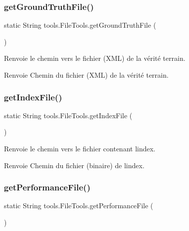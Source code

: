 \subsubsection{\texorpdfstring{get\+Ground\+Truth\+File()}{getGroundTruthFile()}}
{\footnotesize\ttfamily static String tools.\+File\+Tools.\+get\+Ground\+Truth\+File (\begin{DoxyParamCaption}{ }\end{DoxyParamCaption})\hspace{0.3cm}{\ttfamily [static]}}

Renvoie le chemin vers le fichier (X\+ML) de la vérité terrain.

\begin{DoxyReturn}{Renvoie}
Chemin du fichier (X\+ML) de la vérité terrain. 
\end{DoxyReturn}
\mbox{\label{classtools_1_1FileTools_a20238076992e33ac38b17cb439def559}} 
\subsubsection{\texorpdfstring{get\+Index\+File()}{getIndexFile()}}
{\footnotesize\ttfamily static String tools.\+File\+Tools.\+get\+Index\+File (\begin{DoxyParamCaption}{ }\end{DoxyParamCaption})\hspace{0.3cm}{\ttfamily [static]}}

Renvoie le chemin vers le fichier contenant l\textquotesingle{}index.

\begin{DoxyReturn}{Renvoie}
Chemin du fichier (binaire) de l\textquotesingle{}index. 
\end{DoxyReturn}
\mbox{\label{classtools_1_1FileTools_a967fdb1dad8e97ddc7f9a709e6ad0493}} 
\subsubsection{\texorpdfstring{get\+Performance\+File()}{getPerformanceFile()}}
{\footnotesize\ttfamily static String tools.\+File\+Tools.\+get\+Performance\+File (\begin{DoxyParamCaption}{ }\end{DoxyParamCaption})\hspace{0.3cm}{\ttfamily [static]}}

